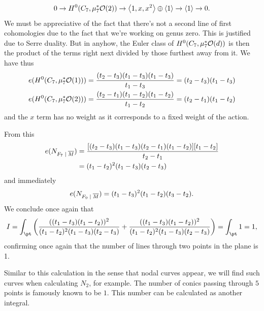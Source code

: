 \documentclass[12pt]{memoir}
\begin{document}
\begin{Ex}
\begin{itemize}
\begin{gather*}
            0\to H^0(C_7,\mu_7^\ast\mathcal{O}(2))\to\left\langle 1,x,x^2\right\rangle\oplus\left\langle 1\right\rangle\to\left\langle 1\right\rangle\to 0.
        \end{gather*}
        We must be appreciative of the fact that there's not a second line of first cohomologies due to the fact that we're working on genus zero. This is justified due to Serre duality. But in anyhow, the Euler class of $H^0(C_7,\mu_7^\ast\mathcal{O}(d))$ is then the product of the terms right next divided by those furthest away from it. We have thus 
        \begin{gather*}
        e(H^0(C_7,\mu_7^\ast\mathcal{O}(1)))=\frac{(t_2-t_3)(t_1-t_3)(t_1-t_3)}{t_1-t_3}=(t_2-t_3)(t_1-t_3)\\
        e(H^0(C_7,\mu_7^\ast\mathcal{O}(2)))=\frac{(t_2-t_1)(t_1-t_2)(t_1-t_2)}{t_1-t_2}=(t_2-t_1)(t_1-t_2)
        \end{gather*}
        and the $x$ term has no weight as it corresponds to a fixed weight of the action.
    \end{itemize}
     From this
        \begin{align*}
             e(N_{F_7\mid\ov M})&=\frac{[(t_2-t_3)(t_1-t_3)(t_2-t_1)(t_1-t_2)][t_1-t_2]}{t_2-t_1}\\
             &=(t_1-t_2)^2(t_1-t_3)(t_2-t_3)
        \end{align*}
    and immediately
    $$e(N_{F_9\mid\ov M})=(t_1-t_3)^2(t_1-t_2)(t_3-t_2).$$
    We conclude once again that 
    $$I=\int_{\pt}\left(\frac{((t_1-t_3)(t_1-t_2))^2}{(t_1-t_2)^2(t_1-t_3)(t_2-t_3)}+\frac{((t_1-t_3)(t_1-t_2))^2}{(t_1-t_2)^2(t_1-t_3)(t_2-t_3)}\right)=\int_{\pt}1=1,$$
    confirming once again that the number of lines through two points in the plane is 1.
\end{Ex}

Similar to this calculation in the sense that nodal curves appear, we will find such curves when calculating $N_2$, for example. The number of conics passing through $5$ points is famously known to be $1$. This number can be calculated as another integral.
\end{document}
